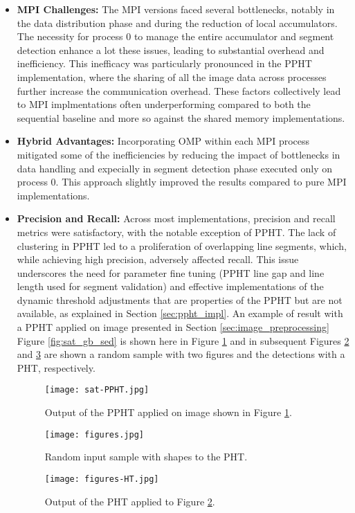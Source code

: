 \documentclass[conference]{IEEEtran}
\begin{document}
\begin{itemize}
        \item \textbf{MPI Challenges:} The MPI versions faced several bottlenecks, notably in the data distribution phase and during the reduction of local accumulators. The necessity for process 0 to manage the entire accumulator and segment detection enhance a lot these issues, leading to substantial overhead and inefficiency. This inefficacy was particularly pronounced in the PPHT implementation, where the sharing of all the image data across processes further increase the communication overhead. These factors collectively lead to MPI implmentations often underperforming compared to both the sequential baseline and more so against the shared memory implementations.
            
        \item \textbf{Hybrid Advantages:} Incorporating OMP within each MPI process mitigated some of the inefficiencies by reducing the impact of bottlenecks in data handling and expecially in segment detection phase executed only on process 0. This approach slightly improved the results compared to pure MPI implementations.
        
        \item \textbf{Precision and Recall:} Across most implementations, precision and recall metrics were satisfactory, with the notable exception of PPHT. The lack of clustering in PPHT led to a proliferation of overlapping line segments, which, while achieving high precision, adversely affected recall. This issue underscores the need for parameter fine tuning (PPHT line gap and line length used for segment validation) and effective implementations of the dynamic threshold adjustments that are properties of the PPHT but are not available, as explained in Section \ref{sec:ppht_impl}. An example of result with a PPHT applied on image presented in Section \ref{sec:image_preprocessing} Figure \ref{fig:sat_gb_sed} is shown here in Figure \ref{fig:satppht} and in subsequent Figures \ref{fig:fig1} and \ref{fig:fig2} are shown a random sample with two figures and the detections with a PHT, respectively.

        \begin{figure}[htbp]
            \centering
            \texttt{[image: sat-PPHT.jpg]}
            \caption{Output of the PPHT applied on image shown in Figure \ref{fig:satppht}.}
            \label{fig:satppht}        
        \end{figure}
        \begin{figure}
            \centering
            \texttt{[image: figures.jpg]}
            \caption{Random input sample with shapes to the PHT.}
            \label{fig:fig1}
        \end{figure}
        \begin{figure}
            \centering
            \texttt{[image: figures-HT.jpg]}
            \caption{Output of the PHT applied to Figure \ref{fig:fig1}.}
            \label{fig:fig2}
            
        \end{figure}

    \end{itemize}
\end{document}
